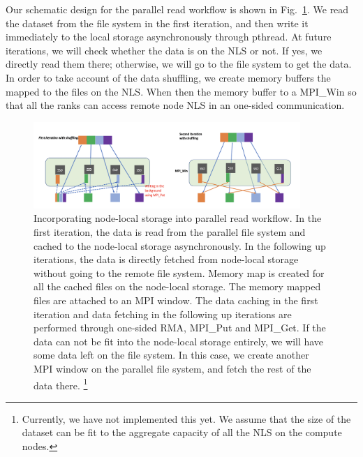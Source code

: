 \documentclass[aps, prb, 11pt, notitlepage]{revtex4-1}
\begin{document}
Our schematic design for the parallel read workflow is shown in Fig.~\ref{fig:read}. We read the dataset from the file system in the first iteration, and then write it immediately to the local storage asynchronously through pthread.  At future iterations, we will check whether the data is on the NLS or not. If yes, we directly read them there; otherwise, we will go to the file system to get the data. In order to take account of the data shuffling, we create memory buffers the mapped to the files on the NLS. When then the memory buffer to a MPI\_Win so that all the ranks can access remote node NLS in an one-sided communication. 
\begin{figure}[hbt]
\centering
\includegraphics[width=0.9\textwidth]{parallel_read.png}
\caption{Incorporating node-local storage into parallel read workflow. In the first iteration, the data is read from the parallel file system and cached to the node-local storage asynchronously. In the following up iterations, the data is directly fetched from node-local storage without going to the remote file system. Memory map is created for all the cached files on the node-local storage. The memory mapped files are attached to an MPI window. The data caching in the first iteration and data fetching in the following up iterations are performed through one-sided RMA, MPI\_Put and MPI\_Get. If the data can not be fit into the node-local storage entirely, we will have some data left on the file system. In this case, we create another MPI window on the parallel file system, and fetch the rest of the data there. \footnote{Currently, we have not implemented this yet. We assume that the size of the dataset can be fit to the aggregate capacity of all the NLS on the compute nodes.}}\label{fig:read}
\end{figure}
\end{document}
